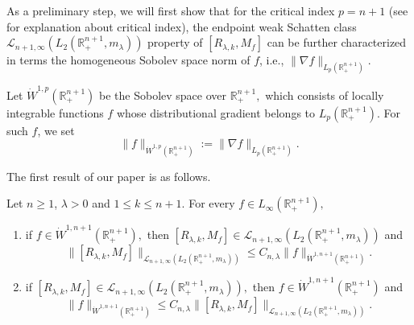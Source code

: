 \documentclass[12pt]{amsart}
\begin{document}
As a preliminary step, we will first show that for the critical index $p=n+1$ (see \cite[Remark 1.6]{FLLXarxiv} for explanation about critical index),  the  endpoint weak Schatten class $\mathcal{L}_{n+1,\infty}(L_2(\mathbb{R}^{n+1}_+,m_{\lambda}))$ property of $[R_{\lambda,k},M_f]$  can be further characterized in terms the homogeneous Sobolev space norm of $f$, i.e., $\|\nabla f\|_{L_p(\mathbb{R}_+^{n+1})}$.





\begin{definition}
Let $\dot{W}^{1,p}(\mathbb{R}_+^{n+1})$ be the Sobolev space over $\mathbb{R}_+^{n+1},$ which consists of locally integrable functions $f$ whose distributional gradient belongs to $L_p(\mathbb{R}_+^{n+1})$. For such $f$, we set
$$\|f\|_{\dot{W}^{1,p}(\mathbb{R}_+^{n+1})}:=\|\nabla f\|_{L_p(\mathbb{R}_+^{n+1})}.$$
\end{definition}

The first result of our paper is as follows.

\begin{theorem}\label{main theorem} Let $n\geq1$, $\lambda>0$ and $1\leq k\leq n+1.$ For every $f\in L_{\infty}(\mathbb{R}^{n+1}_+),$
\begin{enumerate}[{\rm (i)}]
\item\label{mta} if $f\in\dot{W}^{1,n+1}(\mathbb{R}^{n+1}_+),$ then $[R_{\lambda,k},M_f]\in \mathcal{L}_{n+1,\infty}(L_2(\mathbb{R}^{n+1}_+,m_{\lambda}))$ and
$$\|[R_{\lambda,k},M_f]\|_{\mathcal{L}_{n+1,\infty}(L_2(\mathbb{R}^{n+1}_+,m_{\lambda}))}\leq C_{n,\lambda}\|f\|_{\dot{W}^{1,n+1}(\mathbb{R}^{n+1}_+)}.$$
\item\label{mtb} if $[R_{\lambda,k},M_f]\in \mathcal{L}_{n+1,\infty}(L_2(\mathbb{R}^{n+1}_+,m_{\lambda})),$ then $f\in\dot{W}^{1,n+1}(\mathbb{R}^{n+1}_+)$ and
$$\|f\|_{\dot{W}^{1,n+1}(\mathbb{R}^{n+1}_+)}\leq C_{n,\lambda}\|[R_{\lambda,k},M_f]\|_{\mathcal{L}_{n+1,\infty}(L_2(\mathbb{R}^{n+1}_+,m_{\lambda}))}.$$
\end{enumerate}
\end{theorem}
\end{document}
